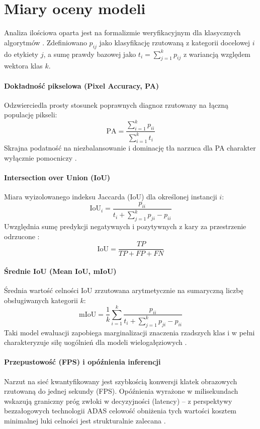 \section{Miary oceny modeli}
Analiza ilościowa oparta jest na formalizmie weryfikacyjnym dla klasycznych algorytmów . Zdefiniowano $p_{ij}$ jako klasyfikację rzutowaną z kategorii docelowej $i$ do etykiety $j$, a sumę prawdy bazowej jako $t_i = \sum_{j=1}^{k} p_{ij}$ z wariancją względem wektora klas $k$.

\paragraph{Dokładność pikselowa (Pixel Accuracy, PA)}
Odzwierciedla prosty stosunek poprawnych diagnoz rzutowany na łączną populację pikseli:
$$\text{PA}=\frac{\sum_{i=1}^{k}p_{ii}}{\sum_{i=1}^{k}t_i}$$
Skrajna podatność na niezbalansowanie i dominację tła narzuca dla PA charakter wyłącznie pomocniczy .

\paragraph{Intersection over Union (IoU)}
Miara wyizolowanego indeksu Jaccarda (IoU) dla określonej instancji $i$:
$$\text{IoU}_i=\frac{p_{ii}}{t_i+\sum_{j=1}^{k}p_{ji}-p_{ii}}$$
Uwzględnia sumę predykcji negatywnych i pozytywnych z kary za przestrzenie odrzucone :
$$\text{IoU}=\frac{TP}{TP+FP+FN}$$

\paragraph{Średnie IoU (Mean IoU, mIoU)}
Średnia wartość celności IoU zrzutowana arytmetycznie na sumaryczną liczbę obsługiwanych kategorii $k$:
$$\text{mIoU}=\frac{1}{k}\sum_{i=1}^{k}\frac{p_{ii}}{t_i+\sum_{j=1}^{k}p_{ji}-p_{ii}}$$
Taki model ewaluacji zapobiega marginalizacji znaczenia rzadszych klas i w pełni charakteryzuje siłę uogólnień dla modeli wielogałęziowych .

\paragraph{Przepustowość (FPS) i opóźnienia inferencji}
Narzut na sieć kwantyfikowany jest szybkością konwersji klatek obrazowych rzutowaną do jednej sekundy (FPS). Opóźnienia wyrażone w milisekundach wskazują graniczny próg zwłoki w decyzyjności (latency) – z perspektywy bezzałogowych technologii ADAS celowość obniżenia tych wartości kosztem minimalnej luki celności jest strukturalnie zalecana .

